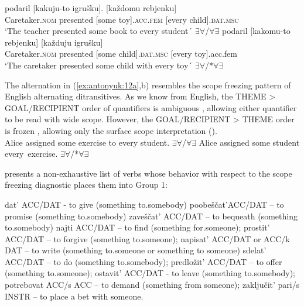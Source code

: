 \documentclass[output=paper,colorlinks,citecolor=brown]{./langscibook}
\begin{document}
\ea%
    \label{ex:antonyuk:12}
    \ea \label{ex:antonyuk:12a}
          {podaril}   {[kakuju-to} {igrušku].}       {[každomu} {rebjenku]}\\
    Caretaker.\textsc{nom} presented   [some       toy].\textsc{acc.fem} [every child].\textsc{dat.msc}\\
    \glt `The teacher presented some book to every student´ ${\exists}{\forall}$/${\forall}{\exists}$
    \ex \label{ex:antonyuk:12b}
           {podaril}   {[kakomu-to} {rebjenku]}    {[každuju} {igrušku]}\\
    Caretaker.\textsc{nom}  presented   [some child].\textsc{dat.msc} [every toy].acc.fem\\
    \glt `The caretaker presented some child with every toy´ ${\exists}{\forall}$/*${\forall}{\exists}$
    \z
\z

The alternation in (\ref{ex:antonyuk:12a},b) resembles the scope freezing pattern of English alternating ditransitives. As we know from English, the THEME  >  GOAL/RECIPIENT order of quantifiers is ambiguous , allowing either quantifier to be read with wide scope. However, the GOAL/RECIPIENT > THEME order is frozen , allowing only the surface scope interpretation (\citealt{Larson1990, Bruening2001}).\\


\ea%
    \label{ex:antonyuk:13}
    \ea \label{ex:antonyuk:13a}
    Alice assigned some exercise to every student. \hfill ${\exists}{\forall}$/${\forall}{\exists}$
    \ex \label{ex:antonyuk:13b}
    Alice assigned some student every~exercise. \hfill ${\exists}{\forall}$/*${\forall}{\exists}$
    \z
\z

 presents a non-exhaustive list of verbs whose behavior with respect to the scope freezing diagnostic places them into Group 1:


\ea%
    \label{ex:antonyuk:14}
    \ea \label{ex:antonyuk:14a}
    dat’ ACC/DAT  {}- to give (something to.somebody)
    \ex \label{ex:antonyuk:14b}
    poobeščat’ACC/DAT – to promise (something to.somebody)
    \ex \label{ex:antonyuk:14c}
    zaveščat’ ACC/DAT – to bequeath (something to.somebody)
    \ex \label{ex:antonyuk:14d}
    najti ACC/DAT – to find (something for.someone);
    \ex \label{ex:antonyuk:14e}
    prostit’ ACC/DAT – to forgive (something to.someone);
    \ex \label{ex:antonyuk:14f}
    napisat’ ACC/DAT or ACC/k DAT – to write (something to.someone or something to someone)
    \ex \label{ex:antonyuk:14g}
    sdelat’ ACC/DAT – to do (something to.somebody);
    \ex \label{ex:antonyuk:14h}
    predložit’ ACC/DAT – to offer (something to.someone);
    \ex \label{ex:antonyuk:14i}
    ostavit’ ACC/DAT  {}- to leave (something to.somebody);
    \ex \label{ex:antonyuk:14j}
    potrebovat ACC/s ACC – to demand (something from someone);
    \ex \label{ex:antonyuk:14k}
    zaključit’ pari/s INSTR – to place a bet with someone.
    \z
\z
\end{document}
